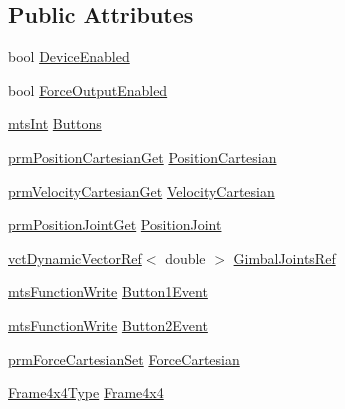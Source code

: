 \subsection*{Public Attributes}
\begin{DoxyCompactItemize}
\item 
bool \hyperlink{structmts_sensable_h_d_1_1_device_data_a7c583a0171cbf2cffd0098c25496fd44}{Device\+Enabled}
\item 
bool \hyperlink{structmts_sensable_h_d_1_1_device_data_aa1a01c751b9d1de7d9e8b36bd6b734a0}{Force\+Output\+Enabled}
\item 
\hyperlink{mts_generic_object_proxy_8h_a24374d6f6591267740de73ba87c08d4e}{mts\+Int} \hyperlink{structmts_sensable_h_d_1_1_device_data_ab66d3995932ca9253743a231dea8fd39}{Buttons}
\item 
\hyperlink{classprm_position_cartesian_get}{prm\+Position\+Cartesian\+Get} \hyperlink{structmts_sensable_h_d_1_1_device_data_a4d969029290b854322a3c4f4f94e37c8}{Position\+Cartesian}
\item 
\hyperlink{classprm_velocity_cartesian_get}{prm\+Velocity\+Cartesian\+Get} \hyperlink{structmts_sensable_h_d_1_1_device_data_a2878f540b39f0f5bce4ad8e82f446fdf}{Velocity\+Cartesian}
\item 
\hyperlink{classprm_position_joint_get}{prm\+Position\+Joint\+Get} \hyperlink{structmts_sensable_h_d_1_1_device_data_a3c3a873384119db3e76de8b622240193}{Position\+Joint}
\item 
\hyperlink{classvct_dynamic_vector_ref}{vct\+Dynamic\+Vector\+Ref}$<$ double $>$ \hyperlink{structmts_sensable_h_d_1_1_device_data_ab0dc17f798dd5a4509031b4f12f42b87}{Gimbal\+Joints\+Ref}
\item 
\hyperlink{classmts_function_write}{mts\+Function\+Write} \hyperlink{structmts_sensable_h_d_1_1_device_data_a9d5eb167f38e79ef41f510177b19a292}{Button1\+Event}
\item 
\hyperlink{classmts_function_write}{mts\+Function\+Write} \hyperlink{structmts_sensable_h_d_1_1_device_data_a2bebe1f4ce8c48a720dc982a42eee385}{Button2\+Event}
\item 
\hyperlink{classprm_force_cartesian_set}{prm\+Force\+Cartesian\+Set} \hyperlink{structmts_sensable_h_d_1_1_device_data_a78fa11b960c040001da25a38887327be}{Force\+Cartesian}
\item 
\hyperlink{structmts_sensable_h_d_1_1_device_data_a46ac85be135ad15c04fbe2b06a689781}{Frame4x4\+Type} \hyperlink{structmts_sensable_h_d_1_1_device_data_acfdea4e1ea34ce4887c3ccee27ecd437}{Frame4x4}
\item 

\end{DoxyCompactItemize}
